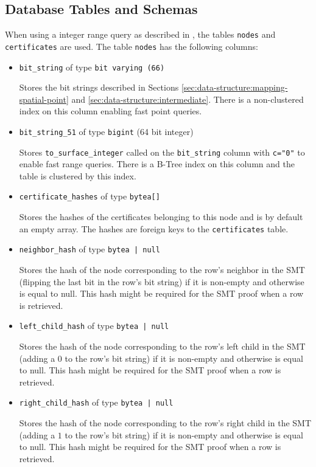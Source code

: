 \documentclass[10pt,conference,compsocconf]{IEEEtran}
\begin{document}
\subsection{Database Tables and Schemas}
\label{sec:implementation:schemas}

When using a integer range query as described in , the tables \texttt{nodes} and \texttt{certificates} are used.
The table \texttt{nodes} has the following columns:
\begin{itemize}
	\item \texttt{bit\_string} of type \texttt{bit varying (66)}
	
	Stores the bit strings described in Sections \ref{sec:data-structure:mapping-spatial-point} and \ref{sec:data-structure:intermediate}.
	There is a non-clustered index on this column enabling fast point queries.
	\item \texttt{bit\_string\_51} of type \texttt{bigint} (64 bit integer)
	
	Stores \texttt{to\_surface\_integer} called on the \texttt{bit\_string} column with \texttt{c="0"} to enable fast range queries.
	There is a B-Tree index on this column and the table is clustered by this index.
	\item \texttt{certificate\_hashes} of type \texttt{bytea[]}
	
	Stores the hashes of the certificates belonging to this node and is by default an empty array.
	The hashes are foreign keys to the \texttt{certificates} table.
	\item \texttt{neighbor\_hash} of type \texttt{bytea | null}
	
	Stores the hash of the node corresponding to the row's neighbor in the SMT (flipping the last bit in the row's bit string) if it is non-empty and otherwise is equal to null.
	This hash might be required for the SMT proof when a row is retrieved.
	\item \texttt{left\_child\_hash} of type \texttt{bytea | null}
	
	Stores the hash of the node corresponding to the row's left child in the SMT (adding a $0$ to the row's bit string) if it is non-empty and otherwise is equal to null.
	This hash might be required for the SMT proof when a row is retrieved.
	\item \texttt{right\_child\_hash} of type \texttt{bytea | null}
	
	Stores the hash of the node corresponding to the row's right child in the SMT (adding a $1$ to the row's bit string) if it is non-empty and otherwise is equal to null.
	This hash might be required for the SMT proof when a row is retrieved.
\end{itemize}
\end{document}
